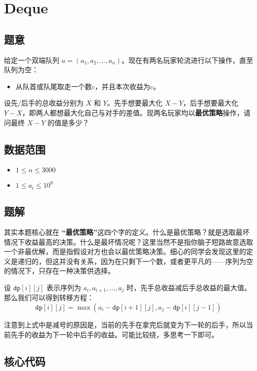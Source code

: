 \section{Deque}
\subsection*{题意}

 给定一个双端队列 $a = (a_1, a_2, \ldots, a_n)$。现在有两名玩家轮流进行以下操作，直至队列为空：
 \begin{itemize}
\item 从队首或队尾取走一个数$c$，并且本次收益为$c$。
\end{itemize}

设先/后手的总收益分别为 $X$ 和 $Y$。先手想要最大化 $X-Y$，后手想要最大化 $Y-X$，即两人都想最大化自己与对手的差值。现两名玩家均以\textbf{最优策略}操作，请问最终 $X-Y$ 的值是多少？




\subsection*{数据范围}
\begin{itemize}
\item $1 \leq n \leq 3000$
\item $1 \leq a_i \leq 10^9$
\end{itemize}

\subsection*{题解}

其实本题核心就在 \textbf{“最优策略”}这四个字的定义。什么是最优策略？就是选取最坏情况下收益最高的决策。什么是最坏情况呢？这里当然不是指你脑子短路故意选取一个非最优解，而是指假设对方也会以最优策略决策。细心的同学会发现这里的定义是递归的，但这并没有关系，因为在只剩下一个数，或者更平凡的——序列为空的情况下，只存在一种决策供选择。

设 ${\texttt{dp}[i][j]}$ 表示序列为 $a_i,a_{i+1},\ldots,a_j$ 时，先手总收益减后手总收益的最大值。那么我们可以得到转移方程：
$$
{\texttt{dp}[i][j]} = \max(a_i - {\texttt{dp}[i+1][j]},a_{j} - {\texttt{dp}[i][j-1]})
$$

注意到上式中是减号的原因是，当前的先手在拿完后就变为下一轮的后手，所以当前先手的收益为下一轮中后手的收益。可能比较绕，多思考一下即可。


\subsection*{核心代码}
\inputminted[linenos,autogobble]{cpp}{./Code/L.cpp}
\newpage